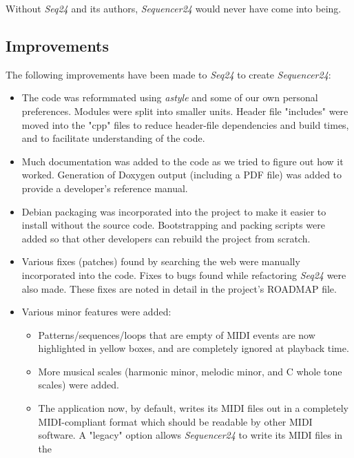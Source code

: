 \documentclass[
 11pt,
 twoside,
 a4paper,
 headinclude,
 footinclude,
 final                                 %
]{article}
\begin{document}
   Without \textsl{Seq24} and its authors, \textsl{Sequencer24} would never
   have come into being.

\subsection{Improvements}
\label{subsec:improvements}

   The following improvements have been made to \textsl{Seq24} to
   create \textsl{Sequencer24}:

   \begin{itemize}
      \item The code was reformmated using \textsl{astyle} and some of our
         own personal preferences.  Modules were split into smaller units.
         Header file "includes" were moved into the "cpp" files to reduce
         header-file dependencies and build times, and to facilitate
         understanding of the code.
      \item Much documentation was added to the code as we tried to figure
         out how it worked.  Generation of Doxygen output (including a PDF
         file) was added to provide a developer's reference manual.
      \item Debian packaging was incorporated into the project to make it
         easier to install without the source code.  Bootstrapping and
         packing scripts were added so that other developers can rebuild the
         project from scratch.
      \item Various fixes (patches) found by searching the web were manually
         incorporated into the code.  Fixes to bugs found while refactoring
         \textsl{Seq24} were also made.  These fixes are noted in detail in
         the project's ROADMAP file.
      \item Various minor features were added:
      \begin{itemize}
         \item Patterns/sequences/loops that are empty of MIDI events are
            now highlighted in yellow boxes, and are completely ignored at
            playback time.
         \item More musical scales (harmonic minor, melodic minor, and
            C whole tone scales) were added.
         \item The application now, by default, writes its MIDI files out
            in a completely MIDI-compliant format which should be readable
            by other MIDI software.  A "legacy" option allows
            \textsl{Sequencer24} to write its MIDI files in the

\end{itemize}
\end{itemize}
\end{document}
